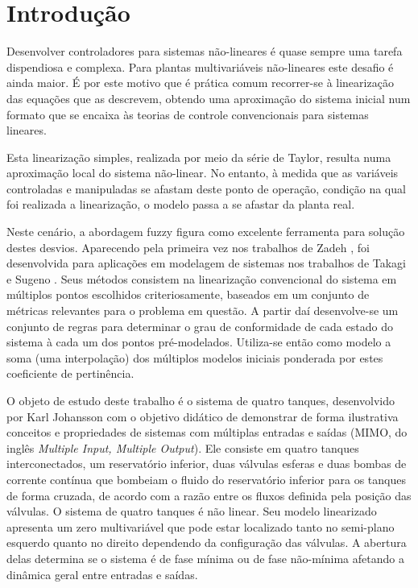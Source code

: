%

\chapter{Introdução} \label{capIntrod}
Desenvolver controladores para sistemas não-lineares é quase sempre uma tarefa dispendiosa e complexa. Para plantas multivariáveis não-lineares este desafio é ainda maior. É por este motivo que é prática comum recorrer-se à linearização das equações que as descrevem, obtendo uma aproximação do sistema inicial num formato que se encaixa às teorias de controle convencionais para sistemas lineares.

Esta linearização simples, realizada por meio da série de Taylor, resulta numa aproximação local do sistema não-linear. No entanto, à medida que as variáveis controladas e manipuladas se afastam deste ponto de operação, condição na qual foi realizada a linearização, o modelo passa a se afastar da planta real.

Neste cenário, a abordagem fuzzy figura como excelente ferramenta para solução destes desvios. Aparecendo pela primeira vez nos trabalhos de Zadeh \cite{zadeh}, foi desenvolvida para aplicações em modelagem de sistemas nos trabalhos de Takagi e Sugeno \cite{takagiSugeno}. Seus métodos consistem na linearização convencional do sistema em múltiplos pontos escolhidos criteriosamente, baseados em um conjunto de métricas relevantes para o problema em questão. A partir daí desenvolve-se um conjunto de regras para determinar o grau de conformidade de cada estado do sistema à cada um dos pontos pré-modelados. Utiliza-se então como modelo a soma (uma interpolação) dos múltiplos modelos iniciais ponderada por estes coeficiente de pertinência. 

O objeto de estudo deste trabalho é o sistema de quatro tanques, desenvolvido por Karl Johansson \cite{johansson2} com o objetivo didático de demonstrar de forma ilustrativa conceitos e propriedades de sistemas com múltiplas entradas e saídas (MIMO, do inglês \textit{Multiple Input, Multiple Output}). Ele consiste em quatro tanques interconectados, um reservatório inferior, duas válvulas esferas e duas bombas de corrente contínua que bombeiam o fluido do reservatório inferior para os tanques de forma cruzada, de acordo com a razão entre os fluxos definida pela posição das válvulas. O sistema de quatro tanques é não linear. Seu modelo linearizado apresenta um zero multivariável que pode estar localizado tanto no semi-plano esquerdo quanto no  direito dependendo da configuração das válvulas. A abertura delas determina se o sistema é de fase mínima ou de fase não-mínima afetando a dinâmica geral entre entradas e saídas.

